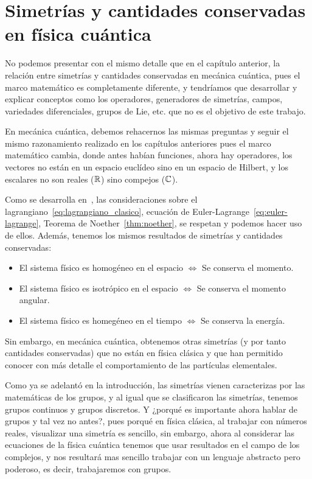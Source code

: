 
\chapter{Simetrías y cantidades conservadas en física cuántica}\label{ch:simetrias-y-cantidades-conservadas-en-fisica-cuantica}

No podemos presentar con el mismo detalle que en el capítulo anterior, la relación entre simetrías y cantidades conservadas en mecánica cuántica, pues el marco matemático es completamente diferente, y tendríamos que desarrollar y explicar conceptos como los operadores, generadores de simetrías, campos, variedades diferenciales, grupos de Lie, etc. que no es el objetivo de este trabajo.

En mecánica cuántica, debemos rehacernos las mismas preguntas y seguir el mismo razonamiento realizado en los capítulos anteriores pues el marco matemático cambia, donde antes habían funciones, ahora hay operadores, los vectores no están en un espacio euclídeo sino en un espacio de Hilbert, y los escalares no son reales ($\mathbb{R}$) sino compejos ($\mathbb{C}$).

Como se desarrolla en~\cite{QMS}, las consideraciones sobre el lagrangiano~\eqref{eq:lagrangiano_clasico}, ecuación de Euler-Lagrange~\eqref{eq:euler-lagrange}, Teorema de Noether~\eqref{thm:noether}, se respetan y podemos hacer uso de ellos.
Además, tenemos los mismos resultados de simetrías y cantidades conservadas:

\begin{itemize}
	\item El sistema físico es homogéneo en el espacio $\Leftrightarrow$ Se conserva el momento.
	\item El sistema físico es isotrópico en el espacio $\Leftrightarrow$ Se conserva el momento angular.
	\item El sistema físico es homegéneo en el tiempo $\Leftrightarrow$ Se conserva la energía.
\end{itemize}

Sin embargo, en mecánica cuántica, obtenemos otras simetrías (y por tanto cantidades conservadas) que no están en física clásica y que han permitido conocer con más detalle el comportamiento de las partículas elementales.

Como ya se adelantó en la introducción, las simetrías vienen caracterizas por las matemáticas de los grupos, y al igual que se clasificaron las simetrías, tenemos grupos continuos y grupos discretos.
Y ¿porqué es importante ahora hablar de grupos y tal vez no antes?, pues porqué en física clásica, al trabajar con números reales, visualizar una simetría es sencillo, sin embargo, ahora al considerar las ecuaciones de la física cuántica tenemos que usar resultados en el campo de los complejos, y nos resultará mas sencillo trabajar con un lenguaje abstracto pero poderoso, es decir, trabajaremos con grupos.

